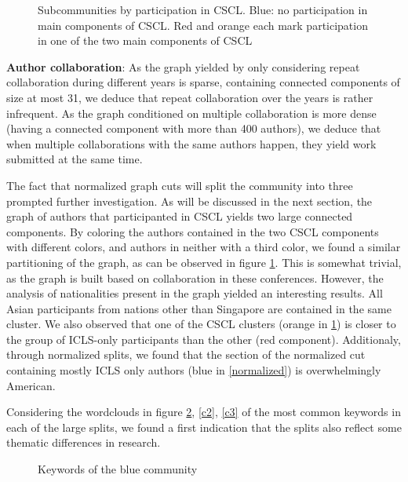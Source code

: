 \documentclass[article,twocolumn]{IEEEtran}
\begin{document}
    \begin{figure}
        \begin{center}\end{center}
        \caption{Subcommunities by participation in CSCL. Blue: no participation in main components of CSCL. Red and orange each mark participation in one of the two main components of CSCL}
        \label{CSCL_components}
    \end{figure}
    
    \textbf{Author collaboration}: As the graph yielded by only considering
repeat collaboration during different years is sparse, containing
connected components of size at most 31, we deduce that repeat
collaboration over the years is rather infrequent. As the graph
conditioned on multiple collaboration is more dense (having a connected
component with more than 400 authors), we deduce that when multiple
collaborations with the same authors happen, they yield work submitted
at the same time.

The fact that normalized graph cuts will split the community into three
prompted further investigation. As will be discussed in the next
section, the graph of authors that participanted in CSCL yields two
large connected components. By coloring the authors contained in the two
CSCL components with different colors, and authors in neither with a
third color, we found a similar partitioning of the graph, as can be
observed in figure \ref{CSCL_components}. This is somewhat trivial, as
the graph is built based on collaboration in these conferences. However,
the analysis of nationalities present in the graph yielded an
interesting results. All Asian participants from nations other than
Singapore are contained in the same cluster. We also observed that one
of the CSCL clusters (orange in \ref{CSCL_components}) is closer to the
group of ICLS-only participants than the other (red component).
Additionaly, through normalized splits, we found that the section of the
normalized cut containing mostly ICLS only authors (blue in
\ref{normalized}) is overwhelmingly American.

Considering the wordclouds in figure \ref{c1}, \ref{c2}, \ref{c3} of the
most common keywords in each of the large splits, we found a first
indication that the splits also reflect some thematic differences in
research.


    \begin{figure}
        \begin{center}\end{center}
        \caption{Keywords of the blue community}
        \label{c1}
    \end{figure}
    
\end{document}
